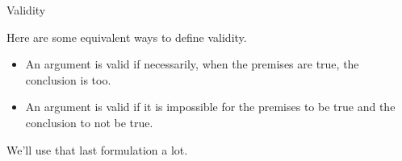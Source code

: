 \documentclass[
  ignorenonframetext,
]{beamer}
\providecommand{\tightlist}{%
  \setlength{\itemsep}{0pt}\setlength{\parskip}{0pt}}
\renewcommand{\,}{\text{, }}
\begin{document}
\begin{frame}{Validity}
\protect\hypertarget{validity}{}

Here are some equivalent ways to define validity.

\begin{itemize}
\tightlist
\item
  An argument is valid if necessarily, when the premises are true, the
  conclusion is too.
\item
  An argument is valid if it is impossible for the premises to be true
  and the conclusion to not be true.
\end{itemize}

We'll use that last formulation a lot.

\end{frame}
\end{document}
